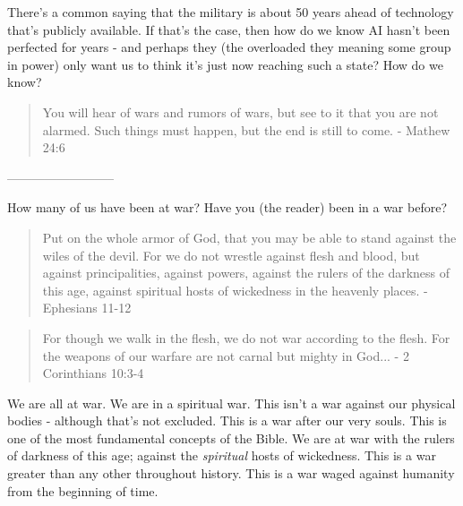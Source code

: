 \documentclass[10pt]{article}
\begin{document}
\begin{multicols}{2}
There's a common saying that the military is about 50 years ahead of technology that's publicly available. If that's the case, then how do we know AI hasn't been perfected for years - and perhaps they (the overloaded they meaning some group in power) only want us to think it's just now reaching such a state? How do we know?

\begin{quotation}
You will hear of wars and rumors of wars, but see to it that you are not alarmed. Such things must happen, but the end is still to come.  - Mathew 24:6
\end{quotation}



--------------------------
























How many of us have been at war? Have you (the reader) been in a war before?

\begin{quotation}
Put on the whole armor of God, that you may be able to stand against the wiles of the devil. For we do not wrestle against flesh and blood, but against principalities, against powers, against the rulers of the darkness of this age, against spiritual hosts of wickedness in the heavenly places. - Ephesians 11-12
\end{quotation}

\begin{quotation}
For though we walk in the flesh, we do not war according to the flesh. For the weapons of our warfare are not carnal but mighty in God... - 2 Corinthians 10:3-4
\end{quotation}

We are all at war. We are in a spiritual war. This isn't a war against our physical bodies - although that's not excluded. This is a war after our very souls. This is one of the most fundamental concepts of the Bible. We are at war with the rulers of darkness of this age; against the \textit{spiritual} hosts  of wickedness. This is a war greater than any other throughout history. This is a war waged against humanity from the beginning of time.














\end{multicols}
\end{document}

